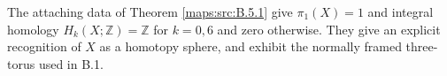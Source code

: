 \begin{theorem}\hypertarget{tag-02JC}{}\label{maps:src:B.5.2}


The attaching data of Theorem \ref{maps:src:B.5.1} give
$\pi_1(X)=1$ and integral homology
$H_k(X;\mathbb Z)=\mathbb Z$ for $k=0,6$ and zero
otherwise.  They give an explicit recognition of $X$
as a homotopy sphere, and exhibit the normally framed
three-torus used in B.1.

\end{theorem}
